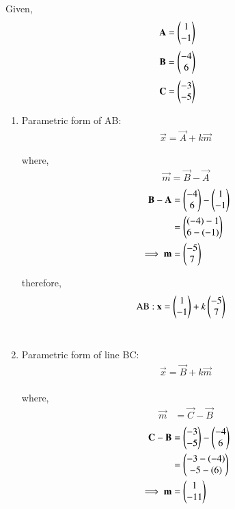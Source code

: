 \documentclass[journal,12pt,twocolumn]{IEEEtran}
\theoremstyle{remark}
\begin{document}
\solution Given, 
\begin{align}
\mathbf{A}  =
    \begin{pmatrix}1 \\ -1\end{pmatrix}   
    \end{align}
\begin{align}
\mathbf{ B }= 
     \begin{pmatrix}-4\\6\end{pmatrix}
\end{align}
\begin{align}
\mathbf{C} = 
     \begin{pmatrix}-3\\-5\end{pmatrix}
     \end{align}
\begin{enumerate} 
\item Parametric form of AB: 
\begin{align}
\vec{x} = \vec{A} + k\vec{m}
\end{align}
  
where, 
\begin{align}
\vec{m} = \vec{B} - \vec{A}
\end{align}
\begin{align}
\mathbf{B} - \mathbf{A} &= \begin{pmatrix}-4\\6\end{pmatrix} - \begin{pmatrix} 1\\-1\end{pmatrix}\\
&= \begin{pmatrix}(-4)-1 \\ 6-(-1)\end{pmatrix}\\
\implies \mathbf {m} &= \begin{pmatrix}-5\\7\end{pmatrix}
\end{align}
           
therefore,
\begin{align}
\text{AB : } \mathbf{x} &= \begin{pmatrix}1\\-1\end{pmatrix} + k\begin{pmatrix}-5\\7\end{pmatrix}
\end{align}\\

\item Parametric form of line BC:
\begin{align}
\vec{x} = \vec{B} + k\vec{m}
\end{align}\\
where, \begin{align}
\vec{m} &= \vec{C} - \vec{B}
\end{align}
\begin{align}
\mathbf{C}- \mathbf{B} &= \begin{pmatrix}-3\\-5\end{pmatrix} - \begin{pmatrix}-4\\6\end{pmatrix}\\
&= \begin{pmatrix}-3 -(-4) \\ -5-(6)\end{pmatrix}\\
\implies \mathbf{m} &= \begin{pmatrix}1\\-11\end{pmatrix}
\end{align}


\end{enumerate}
\end{document}
